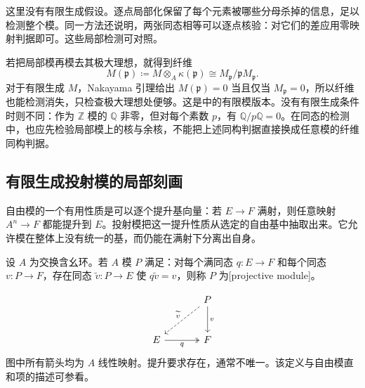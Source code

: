 这里没有有限生成假设。逐点局部化保留了每个元素被哪些分母杀掉的信息，足以检测整个模。同一方法还说明，两张同态相等可以逐点核验：对它们的差应用零映射判据即可。这些局部检测可对照\cite[第4节，定理4.6]{Matsumura1989}。

\ProseParagraphBreak

若把局部模再模去其极大理想，就得到纤维
\[
	M(\mathfrak p)\coloneqq M\otimes_A\kappa(\mathfrak p)
	\cong M_{\mathfrak p}/\mathfrak pM_{\mathfrak p}.
\]
对于有限生成 \(M\)，Nakayama 引理给出 \(M(\mathfrak p)=0\) 当且仅当 \(M_{\mathfrak p}=0\)，所以纤维也能检测消失，只检查极大理想处便够。这是\cite[第4节，定理4.8]{Matsumura1989}中的有限模版本。没有有限生成条件时则不同：作为 \(\mathbb Z\) 模的 \(\mathbb Q\) 非零，但对每个素数 \(p\)，有 \(\mathbb Q/p\mathbb Q=0\)。在同态的检测中，也应先检验局部模上的核与余核，不能把上述同构判据直接换成任意模的纤维同构判据。

\subsection{有限生成投射模的局部刻画}
\label{g5:subsec:0205:02}

自由模的一个有用性质是可以逐个提升基向量：若 \(E\rightarrow F\) 满射，则任意映射 \(A^n\rightarrow F\) 都能提升到 \(E\)。投射模把这一提升性质从选定的自由基中抽取出来。它允许模在整体上没有统一的基，而仍能在满射下分离出自身。

\begin{definition}
\label{g5:def:projective-module}
	设 \(A\) 为交换含幺环。若 \(A\) 模 \(P\) 满足：对每个满同态 \(q:E\rightarrow F\) 和每个同态 \(v:P\rightarrow F\)，存在同态 \(\widetilde v:P\rightarrow E\) 使 \(q\widetilde v=v\)，则称 \(P\) 为[projective module]。
\end{definition}
\[
	\begin{tikzcd}[column sep=large,row sep=large]
		&P\arrow[d,"v"]\arrow[dl,dashed,"\widetilde v"']\\
		E\arrow[r,two heads,"q"']&F
	\end{tikzcd}
\]
图中所有箭头均为 \(A\) 线性映射。提升要求存在，通常不唯一。该定义与自由模直和项的描述可参看\cite[附录B，Projective and injective modules，第277页]{Matsumura1989}。

